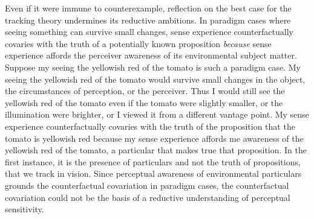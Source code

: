 \documentclass[12pt]{article}
\begin{document}
% 

Even if it were immune to counterexample, reflection on the best case for the tracking theory undermines its reductive ambitions. In paradigm cases where seeing something can survive small changes, sense experience counterfactually covaries with the truth of a potentially known proposition \emph{because} sense experience affords the perceiver awareness of its environmental subject matter. Suppose my seeing the yellowish red of the tomato is such a paradigm case. My seeing the yellowish red of the tomato would survive small changes in the object, the circumstances of perception, or the perceiver. Thus I would still see the yellowish red of the tomato even if the tomato were slightly smaller, or the illumination were brighter, or I viewed it from a different vantage point. My sense experience counterfactually covaries with the truth of the proposition that the tomato is yellowish red because my sense experience affords me awareness of the yellowish red of the tomato, a particular that makes true that proposition. In the first instance, it is the presence of particulars and not the truth of propositions, that we track in vision. Since perceptual awareness of environmental particulars grounds the counterfactual covariation in paradigm cases, the counterfactual covariation could not be the basis of a reductive understanding of perceptual sensitivity.
\end{document}
